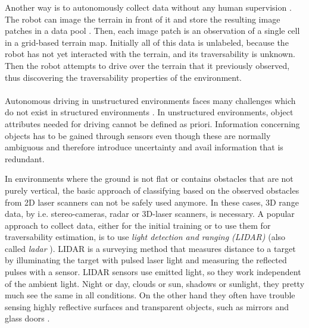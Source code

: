 \documentclass[12pt,a4paper]{report}
\newcommand{\term}{\textit}
\newcommand{\acronym}{\MakeUppercase}
\begin{document}
	Another way is to autonomously collect data without any human supervision 
	\citep{Kim, Lee}. The robot can image the terrain in front of it and store the 
	resulting image patches in a data pool \citep{Kim}. Then, each image patch is an 
	observation of a single cell in a grid-based terrain map. Initially all of this 
	data is unlabeled, because the robot has not yet interacted with the terrain, and 
	its traversability is unknown. Then the robot attempts to drive over the 
	terrain that it previously observed, thus discovering the traversability 
	properties of the environment.
	\\\\
	
	
	Autonomous driving in unstructured environments faces many challenges which do 
	not exist in structured environments \citep{Shabbir}. In unstructured environments, 
	object attributes needed for driving cannot be defined as priori. Information 
	concerning objects has to be gained through sensors even though these are normally 
	ambiguous and therefore introduce uncertainty and avail information that is 
	redundant.
	\par
	In environments where the ground is not flat or contains obstacles that are 
	not purely vertical, the basic approach of classifying based on the observed 
	obstacles from \acronym{2d} laser scanners can not be safely used anymore. 
	In these cases, \acronym{3d} range data, by i.e. stereo-cameras, radar or 
	\acronym{3d}-laser scanners, is necessary. A popular approach to collect data, 
	either for the initial training or to use them for traversability estimation, is to use 
	\term{light detection and ranging (\acronym{lidar})} \citep{Suger, Lalonde} (also 
	called \term{ladar} \citep{Lalonde, Shneier}). \acronym{lidar} is a surveying 
	method that measures distance to a target by illuminating the target with pulsed 
	laser light and measuring the reflected pulses with a sensor. \acronym{lidar} 
	sensors use emitted light, so they work independent of the ambient light. Night 
	or day, clouds or sun, shadows or sunlight, they pretty much see the same in all 
	conditions. On the other hand they often have trouble sensing highly reflective 
	surfaces and transparent objects, such as mirrors and glass doors 
	\citep{HiroseGonet}.
	\par
\end{document}
